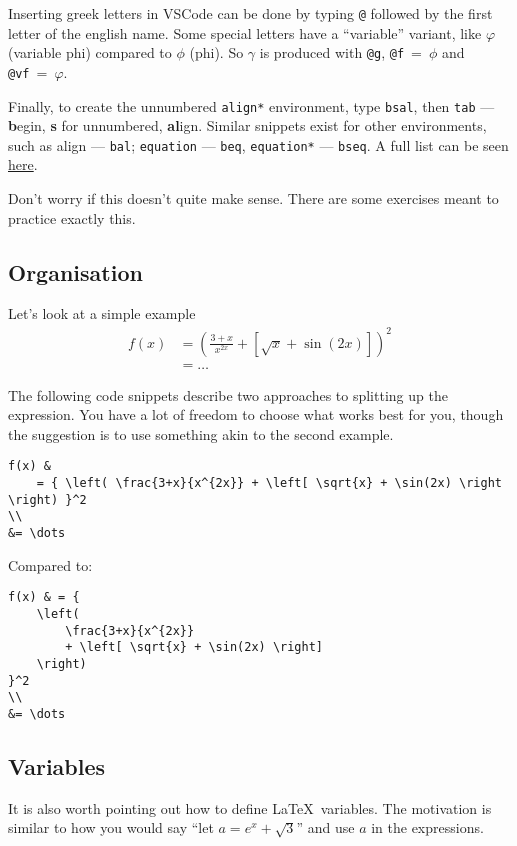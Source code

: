 Inserting greek letters in VSCode can be done by typing \verb|@| followed by the first letter of the english name.
Some special letters have a ``variable'' variant, like \(\varphi\) (variable phi) compared to \(\phi\) (phi).
So \(\gamma\) is produced with \verb|@g|, \verb|@f|~=~\(\phi\) and \verb|@vf|~=~\(\varphi\).

Finally, to create the unnumbered \texttt{align*} environment, type \texttt{bsal}, then \texttt{tab} --- \textbf{b}egin, \textbf{s} for unnumbered, \textbf{al}ign.
Similar snippets exist for other environments, such as align --- \texttt{bal}; \texttt{equation} --- \texttt{beq}, \texttt{equation*} --- \texttt{bseq}.
A full list can be seen \href{https://github.com/James-Yu/LaTeX-Workshop/wiki/Snippets}{here}.

Don't worry if this doesn't quite make sense. There are some exercises meant to practice exactly this.

\subsection{Organisation}
Let's look at a simple example 
\begin{align*}
    f(x) & = {
        \left( 
            \frac{3+x}{x^{2x}}
            + \left[ \sqrt{x} + \sin(2x) \right]
        \right)
    }^2
    \\
    &= \dots
\end{align*}

The following code snippets describe two approaches to splitting up the expression.
You have a lot of freedom to choose what works best for you, though the suggestion is to use something akin to the second example.
\begin{lstlisting}
f(x) &
    = { \left( \frac{3+x}{x^{2x}} + \left[ \sqrt{x} + \sin(2x) \right \right) }^2
\\
&= \dots
\end{lstlisting}
Compared to:
\begin{lstlisting}
f(x) & = {
    \left( 
        \frac{3+x}{x^{2x}}
        + \left[ \sqrt{x} + \sin(2x) \right]
    \right)
}^2
\\
&= \dots
\end{lstlisting}

\subsection{Variables}
It is also worth pointing out how to define \LaTeX\ variables.
The motivation is similar to how you would say ``let \(a = e^x+\sqrt{3}\)'' and use \(a\) in the expressions.

